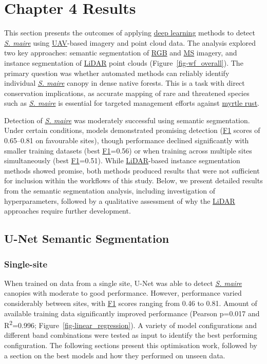 \documentclass[
]{scrreprt}
\begin{document}
\chapter{Chapter 4 Results}\label{results}

This section presents the outcomes of applying
\hyperref[acronyms_DL]{deep learning} methods to detect
\hyperref[acronyms_SM]{\emph{S. maire}} using
\hyperref[acronyms_UAV]{UAV}-based imagery and point cloud data. The
analysis explored two key approaches: semantic segmentation of
\hyperref[acronyms_RGB]{RGB} and \hyperref[acronyms_MS]{MS} imagery, and
instance segmentation of \hyperref[acronyms_LiDAR]{LiDAR} point clouds
(Figure~\ref{fig-wf_overall}). The primary question was whether
automated methods can reliably identify individual
\hyperref[acronyms_SM]{\emph{S. maire}} canopy in dense native forests.
This is a task with direct conservation implications, as accurate
mapping of rare and threatened species such as
\hyperref[acronyms_SM]{\emph{S. maire}} is essential for targeted
management efforts against \hyperref[acronyms_MR]{myrtle rust}.

Detection of \hyperref[acronyms_SM]{\emph{S. maire}} was moderately
successful using semantic segmentation. Under certain conditions, models
demonstrated promising detection (\hyperref[acronyms_F1]{F1} scores of
0.65--0.81 on favourable sites), though performance declined
significantly with smaller training datasets (best
\hyperref[acronyms_F1]{F1}=0.56) or when training across multiple sites
simultaneously (best \hyperref[acronyms_F1]{F1}=0.51). While
\hyperref[acronyms_LiDAR]{LiDAR}-based instance segmentation methods
showed promise, both methods produced results that were not sufficient
for inclusion within the workflows of this study. Below, we present
detailed results from the semantic segmentation analysis, including
investigation of hyperparameters, followed by a qualitative assessment
of why the \hyperref[acronyms_LiDAR]{LiDAR} approaches require further
development.

\section{U-Net Semantic Segmentation}\label{u-net-semantic-segmentation}

\subsection{Single-site}\label{single-site}

When trained on data from a single site, U-Net was able to detect
\hyperref[acronyms_SM]{\emph{S. maire}} canopies with moderate to good
performance. However, performance varied considerably between sites,
with \hyperref[acronyms_F1]{F1} scores ranging from 0.46 to 0.81. Amount
of available training data significantly improved performance (Pearson
p=0.017 and R\textsuperscript{2}=0.996;
Figure~\ref{fig-linear_regression}). A variety of model configurations
and different band combinations were tested as input to identify the
best performing configuration. The following sections present this
optimisation work, followed by a section on the best models and how they
performed on unseen data.
\end{document}
